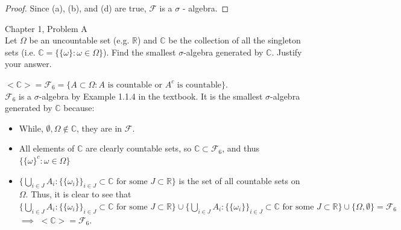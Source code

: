 \documentclass[12pt,letterpaper, onecolumn]{exam}
\newcommand{\real}{\mathbb{R}}
\newcommand{\complex}{\mathbb{C}}
\newcommand{\sigmaF}{\mathcal{F}}
\newcommand{\salg}{$\sigma$-algebra }
\begin{document}
\begin{questions}
\begin{solution}
\begin{proof}
            Since (a), (b), and (d) are true, $\sigmaF$ is a $\sigma$ - algebra. 
        \end{proof}
    \end{solution}

    \question Chapter 1, Problem A \\
    Let $\Omega$ be an uncountable set (e.g. $\real$) and $\complex$ be the collection of all the singleton sets (i.e. $\complex = \{\{\omega\}: \omega \in \Omega\}$). Find the smallest $\sigma$-algebra generated by $\complex$. Justify your answer. 
    \begin{solution}
    $<\complex> = \sigmaF_6 = \{A \subset \Omega: A \textrm{ is countable or } A^c \textrm{ is countable}\}$. \\
    $\sigmaF_6$ is a \salg by Example 1.1.4 in the textbook. It is the smallest \salg \\ generated by $\complex$ because:
    \begin{itemize}
        \item While, $\emptyset, \Omega \notin \complex$, they are in $\sigmaF$.
        \item All elements of $\complex$ are clearly countable sets, so $\complex \subset \sigmaF_6$, and thus $\{\{\omega\}^c: \omega \in \Omega\}$
        \item $\{\bigcup_{i \in J}A_i: \{\{\omega_i\}\}_{i \in J} \subset \complex \textrm{ for some } J \subset \real\}$ is the set of all countable sets on $\Omega$. Thus, it is clear to see that $\{\bigcup_{i \in J}A_i: \{\{\omega_i\}\}_{i \in J} \subset \complex \textrm{ for some } J \subset \real\} \cup \{\bigcup_{i \in J}A_i: \{\{\omega_i\}\}_{i \in J} \subset \complex \textrm{ for some } J \subset \real\} \cup \{\Omega, \emptyset\} = \sigmaF_6$ $\implies$ $<\complex> = \sigmaF_6 $. 
    \end{itemize}
    \end{solution}
\end{questions}
\end{document}
